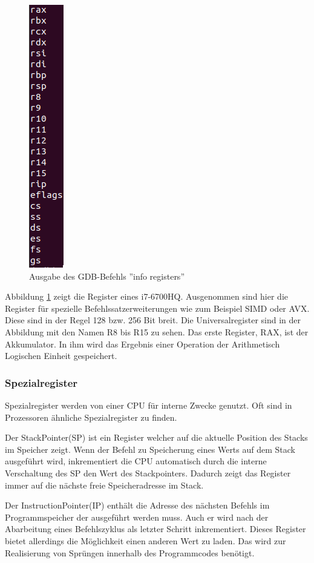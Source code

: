 \documentclass[12pt]{article}
\begin{document}
\begin{figure}[!htb]
\centering
\includegraphics[scale=0.5]{inforeg}
\caption{Ausgabe des GDB-Befehls ''info registers''}
\centering
\label{fig:inforeg}
\end{figure}


\noindent Abbildung \ref{fig:inforeg} zeigt die Register eines i7-6700HQ. Ausgenommen sind hier die Register für spezielle Befehlssatzerweiterungen wie zum Beispiel SIMD oder AVX. Diese sind in der Regel 128 bzw. 256 Bit breit. Die Universalregister sind in der Abbildung mit den Namen R8 bis R15 zu sehen. Das erste Register, RAX, ist der Akkumulator. In ihm wird das Ergebnis einer Operation der Arithmetisch Logischen Einheit gespeichert. 

\subsubsection{Spezialregister}
Spezialregister werden von einer CPU für interne Zwecke genutzt. Oft sind in Prozessoren ähnliche Spezialregister zu finden. 

Der StackPointer(SP) ist ein Register welcher auf die aktuelle Position des Stacks im Speicher zeigt. Wenn der Befehl zu Speicherung eines Werts auf dem Stack ausgeführt wird, inkrementiert die CPU automatisch durch die interne Verschaltung des SP den Wert des Stackpointers. Dadurch zeigt das Register immer auf die nächste freie Speicheradresse im Stack.

Der InstructionPointer(IP) enthält die Adresse des nächsten Befehls im Programmspeicher der ausgeführt werden muss. Auch er wird nach der Abarbeitung eines Befehlszyklus als letzter Schritt inkrementiert. Dieses Register bietet allerdings die Möglichkeit einen anderen Wert zu laden. Das wird zur Realisierung von Sprüngen innerhalb des Programmcodes benötigt. 
\end{document}
